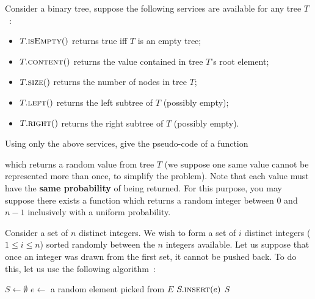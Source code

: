 \documentclass[12pt,addpoints]{exam}
\newcommand{\bigo}{\mathcal{O}}
\begin{document}
\begin{questions}
\question
Consider a binary tree, suppose the following services are available for any tree $T$~:
\begin{itemize}
  \item $T.\Call{isEmpty}$ returns true iff $T$ is an empty tree;
  \item $T.\Call{content}$ returns the value contained in tree $T$'s root element;
  \item $T.\Call{size}$ returns the number of nodes in tree $T$;
  \item $T.\Call{left}$ returns the left subtree of $T$ (possibly empty);
  \item $T.\Call{right}$ returns the right subtree of $T$ (possibly empty).
\end{itemize}
Using only the above services, give the pseudo-code of a function
\begin{center}
\end{center}
which returns a random value from tree $T$ (we suppose one same value cannot be represented more than once, to simplify the problem).
Note that each value must have the \textbf{same probability} of being returned.
For this purpose, you may suppose there exists a  function which returns a random integer between $0$ and $n - 1$ inclusively with a uniform probability.

\question
Consider a set of $n$ distinct integers.
We wish to form a set of $i$ distinct integers ($1 \leq i \leq n$) sorted randomly between the $n$ integers available.
Let us suppose that once an integer was drawn from the first set, it cannot be pushed back.
To do this, let us use the following algorithm~:
\begin{algorithmic}[1]
    \State $S \gets \emptyset$
      \State $e \gets $ a random element picked from $E$
        \State $S.\Call{insert}{e}$
      \EndIf
    \EndWhile
    \State \Return $S$
  \EndFunction
\end{algorithmic}


\end{questions}
\end{document}
